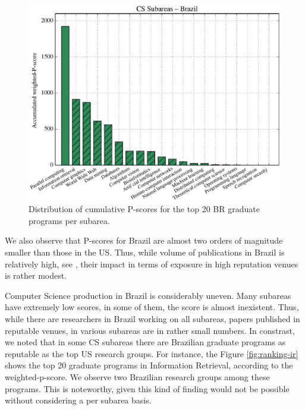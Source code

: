 \documentclass[msc]{ppgccufmg}
\begin{document}
\begin{figure}[tb]
    \centering    
    \includegraphics[width=0.9\linewidth]{fig/chart_br_scaled_sorted.eps}
    \caption{Distribution of cumulative P-scores for the top 20 BR graduate programs per subarea.}
    \label{fig:br-research}
\end{figure}

We also observe that P-scores for Brazil are almost two orders of magnitude smaller than those in the US. Thus, while volume of publications in Brazil is relatively high, see \citep{laender2008}, their impact in terms of exposure in high reputation venues is rather modest. 

Computer Science production in Brazil is considerably uneven. Many subareas have extremely low scores, in some of them, the score is almost inexistent. Thus, while there are researchers in Brazil working on all subareas, papers published in reputable venues, in various subareas are in rather small numbers. In constrast, we noted that in some CS subareas there are Brazilian graduate programs as reputable as the top US research groups. For instance, the Figure \ref{fig:ranking-ir} shows the top 20 graduate programs in Information Retrieval, according to the weighted-p-score. We observe two Brazilian research groups among these programs. This is noteworthy, given this kind of finding would not be possible without considering a per subarea basis.
\end{document}
